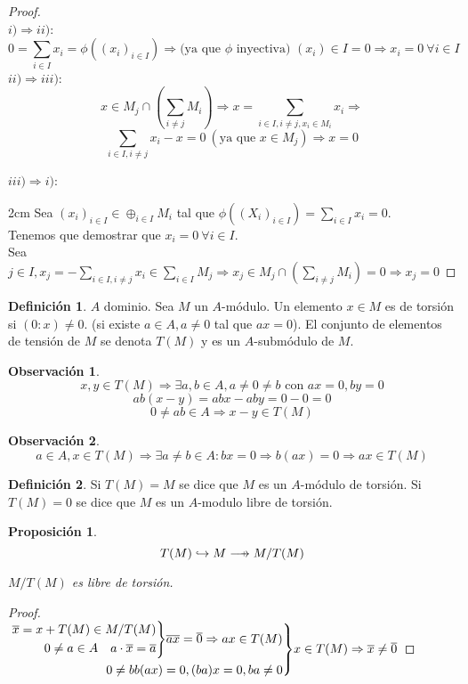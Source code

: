 \documentclass{article}
\def\flechaSobreyectiva{\mathrel{\mkern16mu  \vcenter{\hbox{$\scriptscriptstyle+$}}%
		\mkern-25mu{\longrightarrow}}}
\newenvironment{rcases}
{\left.\begin{aligned}}
	{\end{aligned}\right\rbrace}
\theoremstyle{theorem-style}  %
\newtheorem{proposition}[theorem]{Proposición}
\theoremstyle{definition}
\newtheorem{definition}{Definición}[section]
\newtheorem*{observation}{Observación} %
\theoremstyle{example-style}
\begin{document}
\begin{proof} \ \\
	$i) \Rightarrow ii)$:\\
	 \[ 0=\sum_{i\in I} x_i=\phi ((x_i)_{i\in I}) \Rightarrow \text{(ya que $\phi$ inyectiva) } (x_i) \in I =0 \Rightarrow x_i =0 \ \forall i \in I \]
	$ii) \Rightarrow iii)$:\\
	 \[ x \in M_j \cap (\sum_{i\neq j}M_i) \Rightarrow x=\sum_{i\in I, i\neq j, x_i\in M_i} x_i \Rightarrow\]
	 \[ \sum_{i\in I, i\neq j} x_i -x = 0 \  (\text{ya que }x\in M_j) \Rightarrow  x=0  \]

	$iii) \Rightarrow i)$:

	 2cm \dimexpr\linewidth-2cm\relax
	Sea $ (x_i)_{i\in I} \in \oplus_{i\in I} M_i  $ tal que $ \phi ((X_i)_{i\in I})=\sum_{i\in I} x_i=0 $. \\
	Tenemos que demostrar que $ x_i=0 \ \forall i \in I $. \\
	Sea $ j\in I, x_j = -\sum_{i\in I, i\neq j}x_i \in \sum_{i\in I} M_j \Rightarrow x_j \in M_j \cap (\sum_{i\neq j} M_i)=0 \Rightarrow x_j=0 $
\end{proof}
\begin{definition}
	$ A $ dominio. Sea $ M$ un $ A $-módulo. Un elemento $ x\in M $ es de torsión si $ (0:x)\neq 0 $.
	(si existe $ a\in A, a \neq 0 $ tal que $ ax=0 $).
	El conjunto de elementos de tensión de $ M $ se denota $ T(M) $ y es un $ A $-submódulo de $ M $.
\end{definition}
\begin{observation}
	\[x,y\in T(M) \Rightarrow \exists a,b \in A, a\neq 0\neq b \text{ con } ax=0, by=0\]
	\[ ab(x-y)=abx-aby=0-0=0\]
	\[0\neq ab \in A \Rightarrow x-y \in T(M)\]
\end{observation}
\begin{observation}
\[ a \in A, x \in T(M) \Rightarrow \exists a\neq b \in A : bx=0 \Rightarrow b(ax)=0 \Rightarrow ax \in T(M) \]
\end{observation}
\begin{definition}
	Si $ T(M)=M $ se dice que $ M $ es un $ A $-módulo de torsión. Si $ T(M)=0 $ se dice que $ M $ es un $ A $-modulo libre de torsión.
\end{definition}
\begin{proposition}
	\[  T(M) \hookrightarrow M \flechaSobreyectiva M/T(M)  \]

	$M/T(M)$ es libre de torsión.
\end{proposition}
\begin{proof}
	\ \\

	$\begin{rcases}
		\begin{rcases}
		\overline{x} = x + T(M) \in M/T(M) \\
		0\neq a \in A \quad a \cdot \overline{x} = \overline{a}
		\end{rcases}
	 \overline{ax}=\overline{0}  \Rightarrow ax\in T(M) \\
	 0\neq b b(ax)=0, (ba)x=0, ba\neq 0
	 \end{rcases}
	 x \in T(M) \Rightarrow  \overline{x} \neq \overline{0}
	 $
\end{proof}
\end{document}
